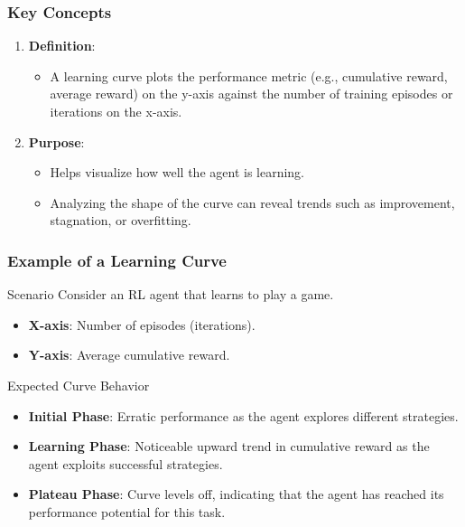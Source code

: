 \documentclass{beamer}
\begin{document}
\begin{frame}[fragile]
    \frametitle{Key Concepts}
    \begin{enumerate}
        \item \textbf{Definition}:
            \begin{itemize}
                \item A learning curve plots the performance metric (e.g., cumulative reward, average reward) on the y-axis against the number of training episodes or iterations on the x-axis.
            \end{itemize}

        \item \textbf{Purpose}:
            \begin{itemize}
                \item Helps visualize how well the agent is learning. 
                \item Analyzing the shape of the curve can reveal trends such as improvement, stagnation, or overfitting.
            \end{itemize}
    \end{enumerate}
\end{frame}

\begin{frame}[fragile]
    \frametitle{Example of a Learning Curve}
    \begin{block}{Scenario}
        Consider an RL agent that learns to play a game.
    \end{block}

    \begin{itemize}
        \item \textbf{X-axis}: Number of episodes (iterations).
        \item \textbf{Y-axis}: Average cumulative reward.
    \end{itemize}

    \begin{block}{Expected Curve Behavior}
        \begin{itemize}
            \item \textbf{Initial Phase}: Erratic performance as the agent explores different strategies.
            \item \textbf{Learning Phase}: Noticeable upward trend in cumulative reward as the agent exploits successful strategies.
            \item \textbf{Plateau Phase}: Curve levels off, indicating that the agent has reached its performance potential for this task.
        \end{itemize}
    \end{block}
\end{frame}
\end{document}
